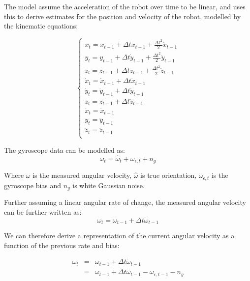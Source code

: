 \documentclass[12pt]{article}
\begin{document}
The model assume the acceleration of the robot over time to be linear, and uses this to derive estimates for the position and velocity of the robot, modelled by the kinematic equations:

\begin{equation}
    \left\{   \begin{array}{c} 
         x_t = x_{t -1} + \Delta t \dot x_{t - 1} + \frac{\Delta t ^2}{2} \ddot x_{t - 1} \\
         y_t = y_{t -1} + \Delta t \dot y_{t - 1} + \frac{\Delta t ^2}{2} \ddot y_{t - 1} \\
         z_t = z_{t -1} + \Delta t \dot z_{t - 1} + \frac{\Delta t ^2}{2} \ddot z_{t - 1} \\
         \dot x_t = \dot x_{t -1} + \Delta t \ddot x_{t - 1}  \\
         \dot y_t = \dot y_{t -1} + \Delta t \ddot y_{t - 1}  \\
         \dot z_t = \dot z_{t -1} + \Delta t \ddot z_{t - 1}  \\
         \ddot x_t = \ddot x_{t - 1}  \\
         \ddot y_t = \ddot y_{t - 1}  \\
         \ddot z_t = \ddot z_{t - 1}  \\ 
    \end{array}  \right.  
\end{equation} 

The gyroscope data can be modelled as:
\begin{equation}
    \omega_t = \hat \omega_t + \omega_{\epsilon, t} + n_g
\end{equation}

Where $\omega$ is the measured angular velocity, $\hat\omega$ is true orientation, $\omega_{\epsilon, t}$ is the gyroscope bias and $n_g$ is white Gaussian noise. 

Further assuming a linear angular rate of change, the measured angular velocity can be further written as:
\begin{equation}
    \omega_t = \omega_{t-1} + \Delta t \dot \omega_{t-1}
\end{equation}

We can therefore derive a representation of the current angular velocity as a function of the previous rate and bias:  

\begin{eqnarray}
    \omega_t & = & \omega_{t-1} + \Delta t \dot \omega_{t-1} \\
    & = & \omega_{t-1} + \Delta t \dot \omega_{t-1} - \omega_{\epsilon, t-1} - n_g \\
\end{eqnarray}
\end{document}
